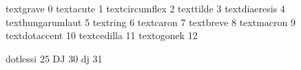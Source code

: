 

\startencoding[x5]

 textgrave         0
 textacute         1
 textcircumflex    2
 texttilde         3
 textdiaeresis     4
 texthungarumlaut  5
 textring          6
 textcaron         7
 textbreve         8
 textmacron        9
 textdotaccent    10
 textcedilla      11 
 textogonek       12 

 dotlessi         25
 DJ               30
 dj               31

